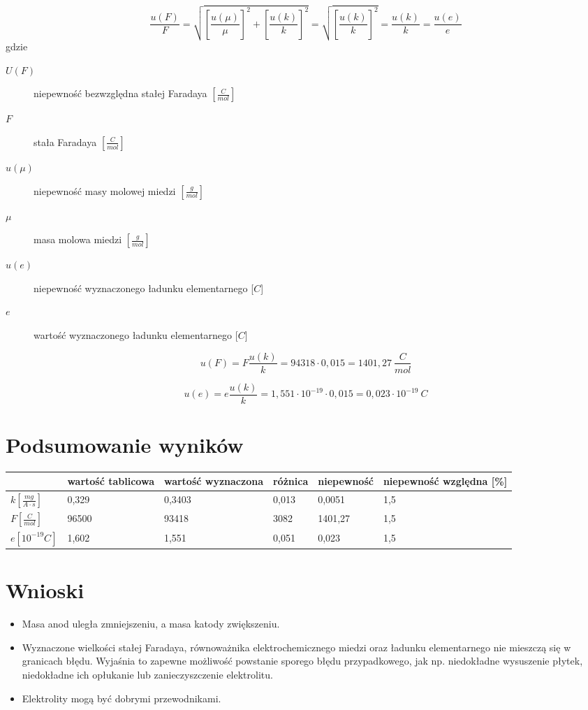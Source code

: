 \documentclass[a4paper,11pt]{article}
\begin{document}
$$
\frac{u(F)}{F} = \sqrt{\left[\frac{u(\mu)}{\mu} \right]^2 + \left[\frac{u(k)}{k} \right]^2 } = \sqrt{\left[\frac{u(k)}{k} \right]^2 } = \frac{u(k)}{k}  =   \frac{u(e)}{e}
$$
gdzie
\begin{description}
\item [$U(F)$] niepewność bezwzględna stałej Faradaya $\left[\frac{C}{mol} \right]$
\item [$F$] stała Faradaya $\left[\frac{C}{mol} \right]$
\item [$u(\mu)$] niepewność masy molowej miedzi $\left[\frac{g}{mol}\right]$
\item [$\mu$] masa molowa miedzi $\left[\frac{g}{mol}\right]$
\item [$u(e)$] niepewność wyznaczonego ładunku elementarnego [$C$]
\item [$e$] wartość wyznaczonego ładunku elementarnego [$C$]
\end{description}
$$
u(F) = F \frac{u(k)}{k}  =  94318  \cdot  0,015 = 1401,27  ~ \frac{C}{mol} 
$$

$$
u(e) = e \frac{u(k)}{k}  =  1,551 \cdot 10^{-19}  \cdot   0,015  = 0,023 \cdot 10^{-19} ~C 
$$

\section{Podsumowanie wyników}

\begin{tabular}{|l|p{2cm}|p{}| p{2cm}| p{2cm} | p{}|}
\hline  & wartość tablicowa  & wartość wyznaczona & różnica & niepewność  & niepewność względna [\%]  \\ 
\hline $k \left[  \frac{mg}{A \cdot s}\right]$ & 0,329  & 0,3403  & 0,013 & 0,0051 & 1,5  \\ 
\hline $F \left[  \frac{C}{mol}\right]$ & 96500 & 93418  & 3082  & 1401,27  & 1,5  \\ 
\hline $e [10^{-19} C]$ & 1,602   & 1,551    & 0,051 & 0,023   & 1,5  \\ 
\hline 
\end{tabular} 

\section{Wnioski}
\begin{itemize}

\item Masa anod uległa zmniejszeniu, a masa katody zwiększeniu. 
\item Wyznaczone wielkości stałej Faradaya, równoważnika elektrochemicznego miedzi oraz ładunku elementarnego nie mieszczą się w granicach błędu. Wyjaśnia to zapewne możliwość powstanie sporego błędu przypadkowego, jak np. niedokładne wysuszenie płytek, niedokładne ich opłukanie lub zanieczyszczenie elektrolitu. 
\item Elektrolity mogą być dobrymi przewodnikami. 
 
\end{itemize}
\end{document}

